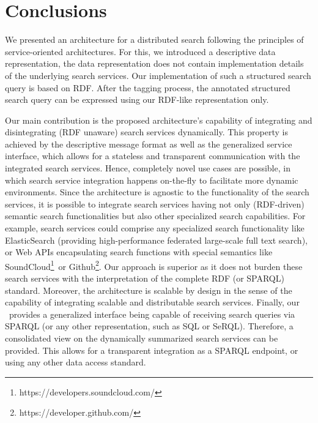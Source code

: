 






\section{Conclusions}\label{chafedsearch:sec:conclusion}

We presented an architecture for a distributed search following the principles of service-oriented architectures. 
For this, we introduced a descriptive data representation, \ie the data representation does not contain implementation details of the underlying search services. 
Our implementation of such a structured search query is based on RDF.
After the tagging process, the annotated structured search query can be expressed using our RDF-like representation only.%

Our main contribution is the proposed architecture's capability of integrating and disintegrating (RDF unaware) search services dynamically.
This property is achieved by the descriptive message format as well as the ge\-ne\-ra\-lized service interface, which allows for a stateless and transparent communication with the integrated search services.
Hence, completely novel use cases are possible, in which search service integration happens on-the-fly to facilitate more dynamic environments.
Since the architecture is agnostic to the functionality of the search services, it is possible to integrate search services having not only (RDF-driven) semantic search functionalities but also other specialized search capabilities. 
For example, search services could comprise any specialized search functionality like ElasticSearch (providing high-performance federated large-scale full text search), or Web APIs encapsulating search functions with special semantics like SoundCloud\footnote{https://developers.soundcloud.com/}\ or Github\footnote{https://developer.github.com/}.
Our approach is superior as it does not burden these search services with the interpretation of the complete RDF (or SPARQL) standard.
Moreover, the architecture is scalable by design in the sense of the capability of integrating scalable and distributable search services. 
Finally, our \ provides a generalized interface being capable of receiving search queries via SPARQL (or any other representation, such as SQL or SeRQL). 
Therefore, a consolidated view on the dynamically summarized search services can be provided.
This allows for a transparent integration as a SPARQL endpoint, or using any other data access standard.


